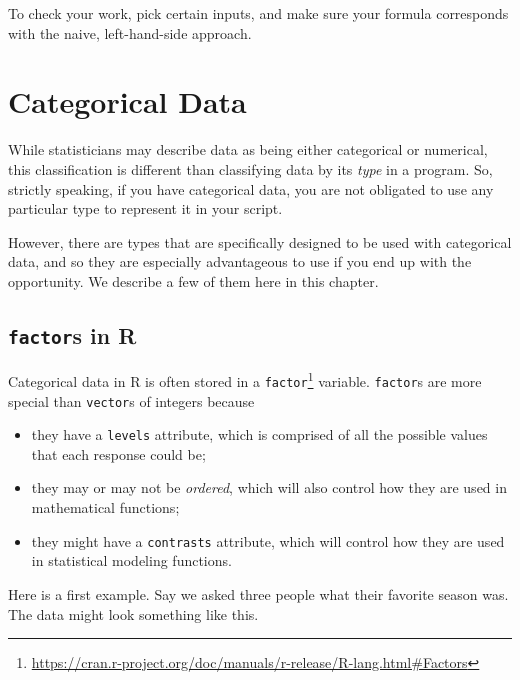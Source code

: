 \documentclass[
  12pt,
  krantz2]{krantz}
\providecommand{\tightlist}{%
  \setlength{\itemsep}{0pt}\setlength{\parskip}{0pt}}
\renewcommand{\href}[2]{#2\footnote{\url{#1}}}
\begin{document}
To check your work, pick certain inputs, and make sure your formula corresponds with the naive, left-hand-side approach.

\hypertarget{categorical-data}{%
\chapter{Categorical Data}\label{categorical-data}}

While statisticians may describe data as being either categorical or numerical, this classification is different than classifying data by its \emph{type} in a program. So, strictly speaking, if you have categorical data, you are not obligated to use any particular type to represent it in your script.

However, there are types that are specifically designed to be used with categorical data, and so they are especially advantageous to use if you end up with the opportunity. We describe a few of them here in this chapter.

\hypertarget{factors-in-r}{%
\section{\texorpdfstring{\texttt{factor}s in R}{factors in R}}\label{factors-in-r}}

Categorical data in R is often stored in a \href{https://cran.r-project.org/doc/manuals/r-release/R-lang.html\#Factors}{\texttt{factor}} variable. \texttt{factor}s are more special than \texttt{vector}s of integers because

\begin{itemize}
\tightlist
\item
  they have a \texttt{levels} attribute, which is comprised of all the possible values that each response could be;
\item
  they may or may not be \emph{ordered}, which will also control how they are used in mathematical functions;
\item
  they might have a \texttt{contrasts} attribute, which will control how they are used in statistical modeling functions.
\end{itemize}

Here is a first example. Say we asked three people what their favorite season was. The data might look something like this.
\end{document}
